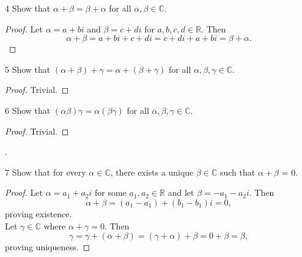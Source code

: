 \documentclass[12pt, letterpaper]{article}
\begin{document}
\begin{problem}{4}
Show that $\alpha + \beta = \beta + \alpha$ for all $\alpha,\beta\in\mathbb{C}$.
\end{problem}

\begin{proof}
Let $\alpha = a + bi$ and $\beta = c + di$ for $a,b,c,d\in\mathbb{R}$. Then
$$\alpha + \beta = a + bi + c + di = c + di + a + bi = \beta + \alpha.$$
\end{proof}

\begin{problem}{5}
Show that $(\alpha+\beta)+\gamma=\alpha+(\beta+\gamma)$ for all $\alpha,\beta,\gamma\in\mathbb{C}$.
\end{problem}

\begin{proof}
Trivial.
\end{proof}

\begin{problem}{6}
Show that $(\alpha\beta)\gamma=\alpha(\beta\gamma)$ for all $\alpha,\beta,\gamma\in\mathbb{C}$.
\end{problem}

\begin{proof}
Trivial.
\end{proof}.

\begin{problem}{7}
Show that for every $\alpha\in\mathbb{C}$, there exists a unique $\beta\in\mathbb{C}$ such that $\alpha+\beta$ = 0.
\end{problem}

\begin{proof}
Let $\alpha=a_1+a_2i$ for some $a_1,a_2\in\mathbb{R}$ and let $\beta = -a_1-a_2i$. Then
$$\alpha+\beta=(a_1-a_1)+(b_1-b_1)i=0,$$
proving existence. 
\\Let $\gamma\in\mathbb{C}$ where $\alpha+\gamma=0$. Then
$$\gamma = \gamma + (\alpha + \beta) = (\gamma + \alpha) +\beta = 0 + \beta = \beta,$$
proving uniqueness.
\end{proof}
\end{document}
